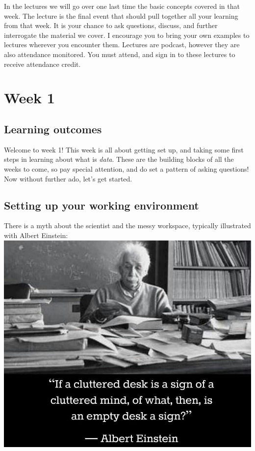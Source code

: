 \documentclass[]{book}
\theoremstyle{definition}
\theoremstyle{definition}
\theoremstyle{definition}
\theoremstyle{remark}
\begin{document}
In the lectures we will go over one last time the basic concepts covered
in that week. The lecture is the final event that should pull together
all your learning from that week. It is your chance to ask questions,
discuss, and further interrogate the material we cover. I encourage you
to bring your own examples to lectures wherever you encounter them.
Lectures are podcast, however they are also attendance monitored. You
must attend, and sign in to these lectures to receive attendance credit.

\hypertarget{week1}{%
\chapter{Week 1}\label{week1}}

\hypertarget{learning-outcomes}{%
\section{Learning outcomes}\label{learning-outcomes}}

Welcome to week 1! This week is all about getting set up, and taking
some first steps in learning about what is \emph{data}. These are the
building blocks of all the weeks to come, so pay special attention, and
do set a pattern of asking questions! Now without further ado, let's get
started.

\hypertarget{setting-up-your-working-environment}{%
\section{Setting up your working
environment}\label{setting-up-your-working-environment}}

There is a myth about the scientist and the messy workspace, typically
illustrated with Albert Einstein:
\includegraphics{imgs/einstein_desk.jpg}
\end{document}
